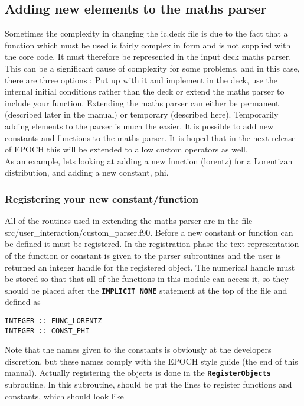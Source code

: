 \documentclass[12pt]{article}
\newcommand{\simpleboxverbatim}{\begin{Verbatim}[obeytabs=true,frame=single,
  framerule=0.5mm,rulecolor=\color{warwickmid}]}
\newcommand{\inlinecode}[1]{{\color{warwickred} \bf\texttt{#1}}}
\newcommand{\EPOCH}{{\color{warwickdark}\fontfamily{phv}\selectfont EPOCH} }
\begin{document}
\subsection{Adding new elements to the maths parser}
Sometimes the complexity in changing the ic.deck file is due to the fact that
a function which must be used is fairly complex in form and is not supplied
with the core code. It must therefore be represented in the input deck maths
parser. This can be a significant cause of complexity for some problems, and
in this case, there are three options : Put up with it and implement in the
deck, use the internal initial conditions rather than the deck or extend the
maths parser to include your function. Extending the maths parser can either
be permanent (described later in the manual) or temporary (described
here). Temporarily adding elements to the parser is much the easier. It is
possible to add new constants and functions to the maths parser. It is hoped
that in the next release of \EPOCH this will be extended to allow custom
operators as well.\\

As an example, lets looking at adding a new function (lorentz) for a
Lorentizan distribution, and adding a new constant, phi.

\subsubsection{Registering your new constant/function}
All of the routines used in extending the maths parser are in the file
src/user\_interaction/custom\_parser.f90.  Before a new constant or function
can be defined it must be registered. In the registration phase the text
representation of the function or constant is given to the parser subroutines
and the user is returned an integer handle for the registered object. The
numerical handle must be stored so that that all of the functions in this
module can access it, so they should be placed after the \inlinecode{IMPLICIT
NONE} statement at the top of the file and defined as

\simpleboxverbatim
INTEGER :: FUNC_LORENTZ
INTEGER :: CONST_PHI
\end{Verbatim}

Note that the names given to the constants is obviously at the developers
discretion, but these names comply with the \EPOCH style guide (the end of
this manual). Actually registering the objects is done in the
\inlinecode{RegisterObjects} subroutine. In this subroutine, should be put the
lines to register functions and constants, which should look like
\end{document}
